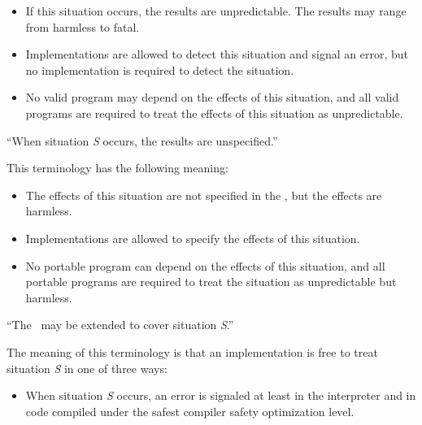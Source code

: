 \begin{flushdesc}
  \begin{itemize}
    
  \item  If this situation occurs, the results are unpredictable.  The
    results may range from harmless to fatal.
    
  \item  Implementations are allowed to detect this situation and
    signal an error, but no implementation is required to detect the
    situation.
    
  \item  No valid program may depend on the effects of this
    situation, and all valid programs are required to treat the effects 
    of this situation as unpredictable.
    
  \end{itemize}
 
\item[``When situation \emph{S} occurs, the results are unspecified.'']
  
  This terminology has the following meaning:
  
  \begin{itemize}
    
  \item  The effects of this situation are not specified in
    the \OS, but the effects are harmless.
    
  \item  Implementations are allowed to specify the effects of
    this situation.
    
  \item  No portable program can depend on the effects of this
    situation, and all portable programs are required to treat the situation
    as unpredictable but harmless.
    
  \end{itemize}
  
\item[``The \CLOS\ may be extended to cover situation \emph{S}.'']

The meaning of this terminology is that an implementation is free to treat
situation \emph{S} in one of three ways:

\begin{itemize}

\item  When situation \emph{S} occurs, an error is signaled at least
in the interpreter and in code compiled under the safest compiler
safety optimization level.


\end{itemize}
\end{flushdesc}
